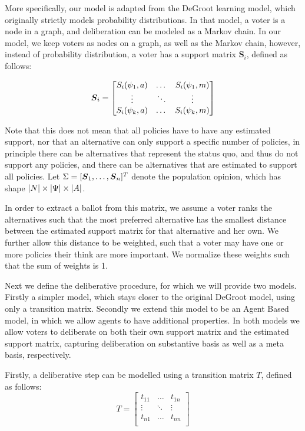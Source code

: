 More specifically, our model is adapted from the DeGroot learning model, which originally strictly models probability distributions. In that model, a voter is a node in a graph, and deliberation can be modeled as a Markov chain. In our model, we keep voters as nodes on a graph, as well as the Markov chain, however, instead of probability distribution, a voter has a support matrix $\boldsymbol{S}_i$, defined as follows:

\[
	\boldsymbol{S}_i =\begin{bmatrix}
		S_i(\psi_1 , a) & \dots  & S_i(\psi_1 , m) \\
		\vdots             & \ddots & \vdots             \\
		S_i(\psi_k , a) & \dots  & S_i(\psi_k , m) \\
	\end{bmatrix}
\]

Note that this does not mean that all policies have to have any estimated support, nor that an alternative can only support a specific number of policies, in principle there can be alternatives that represent the status quo, and thus do not support any policies, and there can be alternatives that are estimated to support all policies.  Let $\Sigma= [\boldsymbol{S}_1, \dots, \boldsymbol{S}_{n}]^{T}$ denote the population opinion, which has shape \(|N| \times |\Psi| \times |A|\).

In order to extract a ballot from this matrix, we assume a voter ranks the alternatives such that the most preferred alternative has the smallest distance between the estimated support matrix for that alternative and her own. We further allow this distance to be weighted, such that a voter may have one or more policies their think are more important. We normalize these weights such that the sum of weights is 1.

Next we define the deliberative procedure, for which we will provide two models. Firstly a simpler model, which stays closer to the original DeGroot model, using only a transition matrix. Secondly we extend this model to be an Agent Based model, in which we allow agents to have additional properties. In both models we allow voters to deliberate on both their own support matrix and the estimated support matrix, capturing deliberation on substantive basis as well as a meta basis, respectively.

Firstly, a deliberative step can be modelled using a transition matrix $T$, defined as follows:
\[
	T=\begin{bmatrix}
		t_{11} & \dots  & t_{1n} \\
		\vdots & \ddots & \vdots \\
		t_{n1} & \dots  & t_{nn} \\
	\end{bmatrix}
\]

